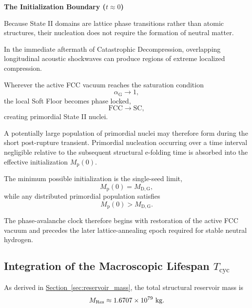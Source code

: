 \textbf{The Initialization Boundary (\(t\approx0\))}

Because State II domains are lattice phase transitions rather than atomic
structures, their nucleation does not require the formation of neutral matter.

In the immediate aftermath of Catastrophic Decompression, overlapping
longitudinal acoustic shockwaves can produce regions of extreme localized
compression.

Wherever the active FCC vacuum reaches the saturation condition
\begin{equation}
    \alpha_{\mathrm G}
    \rightarrow
    1,
\end{equation}
the local Soft Floor becomes phase locked,
\begin{equation}
    \mathrm{FCC}
    \rightarrow
    \mathrm{SC},
\end{equation}
creating primordial State II nuclei.

A potentially large population of primordial nuclei may therefore form during
the short post-rupture transient. Primordial nucleation occurring over a time
interval negligible relative to the subsequent structural e-folding time is
absorbed into the effective initialization
\(M_{\mathrm p}(0)\).

The minimum possible initialization is the single-seed limit,
\begin{equation}
    M_{\mathrm p}(0)
    =
    M_{\mathrm{D,G}},
\end{equation}
while any distributed primordial population satisfies
\begin{equation}
    M_{\mathrm p}(0)
    >
    M_{\mathrm{D,G}}.
\end{equation}

The phase-avalanche clock therefore begins with restoration of the active FCC
vacuum and precedes the later lattice-annealing epoch required for stable
neutral hydrogen.


\subsection{Integration of the Macroscopic Lifespan
\texorpdfstring{$T_{\mathrm{cyc}}$}{Tcyc}}

As derived in
\hyperref[sec:reservoir_mass]{Section~\ref*{sec:reservoir_mass}},
the total structural reservoir mass is
\begin{equation}
    M_{\mathrm{Res}}
    \approx
    1.6707\times10^{79}
    \ {\rm kg}.
\end{equation}

